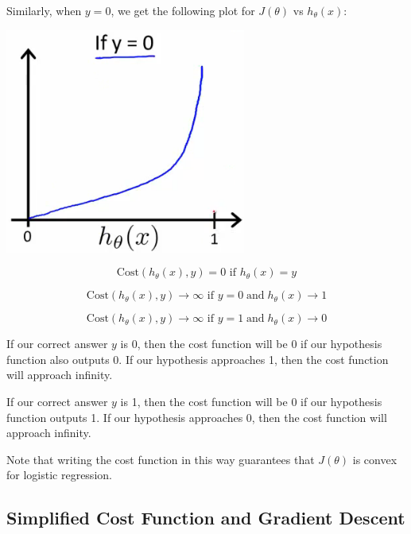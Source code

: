 \documentclass[UTF8]{article}
\begin{document}
Similarly, when $y = 0$, we get the following plot for $J(\theta)$ vs $h_\theta(x)$:

\includegraphics[width = \textwidth]{NotePics/6_4_2.png}

\[ \mathrm{Cost}(h_\theta(x),y) = 0 \text{ if } h_\theta(x) = y \]

\[ \mathrm{Cost}(h_\theta(x),y) \rightarrow \infty \text{ if } y = 0 \; \mathrm{and} \; h_\theta(x) \rightarrow 1 \]

\[ \mathrm{Cost}(h_\theta(x),y) \rightarrow \infty \text{ if } y = 1 \; \mathrm{and} \; h_\theta(x) \rightarrow 0 \]

If our correct answer $y$ is 0, then the cost function will be 0 if our hypothesis function also outputs 0. If our hypothesis approaches 1, then the cost function will approach infinity.

If our correct answer $y$ is 1, then the cost function will be 0 if our hypothesis function outputs 1. If our hypothesis approaches 0, then the cost function will approach infinity.

Note that writing the cost function in this way guarantees that $J(\theta)$ is convex for logistic regression.

\subsection{Simplified Cost Function and Gradient Descent}
\end{document}
